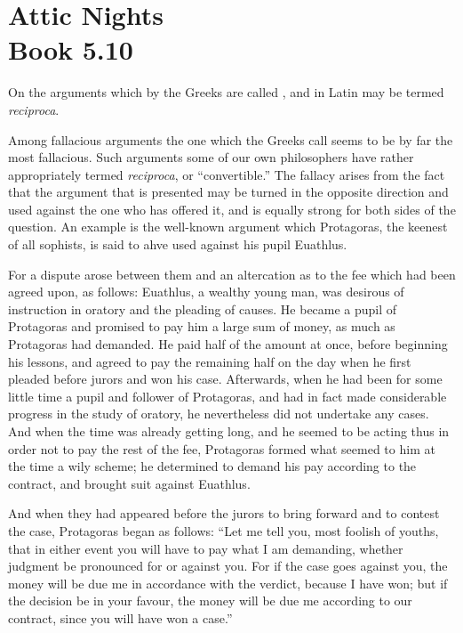 
\author{Aulus Gellius}
\chapter[Aulus Gellius -- Attic Nights, bk. 5.10]{Attic
Nights\\\smaller Book 5.10}


 \begin{center}{\small On the arguments which by the Greeks
are called , and in Latin may be termed
\textit{reciproca}.}\end{center}

Among fallacious arguments the one which the Greeks call
 seems to be by far the most fallacious. Such
arguments some of our own philosophers have rather appropriately
termed \textit{reciproca}, or ``convertible.'' The fallacy arises from
the fact that the argument that is presented may be turned in the
opposite direction and used against the one who has offered it, and is
equally strong for both sides of the question. An example is the
well-known argument which Protagoras, the keenest of all sophists, is
said to ahve used against his pupil Euathlus.

 For a dispute arose between them and an altercation as to
the fee which had been agreed upon, as follows: Euathlus, a wealthy
young man, was desirous of instruction in oratory and the pleading of
causes. He became a pupil of Protagoras and promised to pay him a
large sum of money, as much as Protagoras had demanded. He paid half
of the amount at once, before beginning his lessons, and agreed to pay
the remaining half on the day when he first pleaded before jurors and
won his case. Afterwards, when he had been for some little time a
pupil and follower of Protagoras, and had in fact made considerable
progress in the study of oratory, he nevertheless did not undertake
any cases. And when the time was already getting long, and he seemed
to be acting thus in order not to pay the rest of the fee, Protagoras
formed what seemed to him at the time a wily scheme; he determined to
demand his pay according to the contract, and brought suit against
Euathlus.

And when they had appeared before the jurors to bring forward and to
contest the case, Protagoras began as follows: ``Let me tell you, most
foolish of youths, that in either event you will have to pay what I am
demanding, whether judgment be pronounced for or against you. For if
the case goes against you, the money will be due me in accordance with
the verdict, because I have won; but if the decision be in your
favour, the money will be due me according to our contract, since you
will have won a case.''


